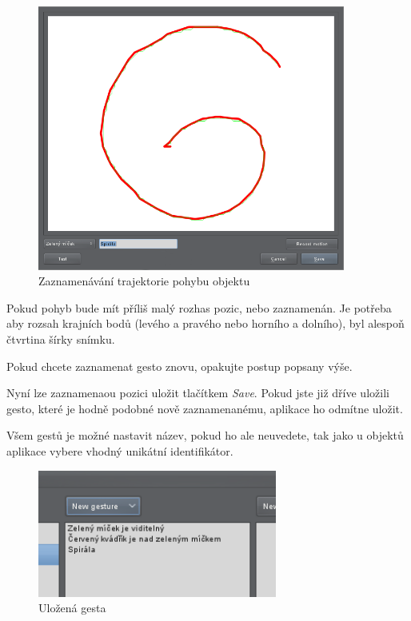 \begin{figure}[h]
\centering
\includegraphics[width=0.9\textwidth]{newmotiongesture2.png}
\caption{Zaznamenávání trajektorie pohybu objektu}
\label{fig:newrelationgesture2}
\end{figure}

Pokud pohyb bude mít příliš malý rozhas pozic, nebo zaznamenán. Je potřeba aby
rozsah krajních bodů (levého a pravého nebo horního a dolního), byl alespoň
čtvrtina šírky snímku.

Pokud chcete zaznamenat gesto znovu, opakujte postup popsany výše.

Nyní lze zaznamenaou pozici uložit tlačítkem \emph{Save}. Pokud jste již dříve
uložili gesto, které je hodně podobné nově zaznamenanému, aplikace ho odmítne
uložit.

\bigskip
Všem gestů je možné nastavit název, pokud ho ale neuvedete, tak jako u objektů
aplikace vybere vhodný unikátní identifikátor.

\begin{figure}[H]
\centering
\includegraphics[width=0.7\textwidth]{gestures.png}
\caption{Uložená gesta}
\label{fig:gestures}
\end{figure}

